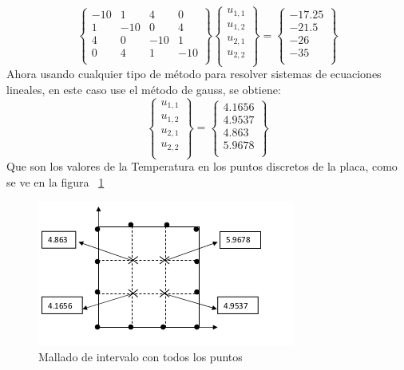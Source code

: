 \documentclass[11pt,a4paper]{article}
\begin{document}
$$
\left\{\begin{array}{cccc}
    -10 & 1 & 4 & 0 \\
    1 & -10 & 0 & 4 \\
    4 & 0 & -10 & 1 \\
    0 & 4 & 1 & -10 \\
    \end{array}\right\}
\left\{\begin{array}{c}
    u_{1,1}\\
    u_{1,2}\\
    u_{2,1}\\
    u_{2,2}\\
    \end{array}\right\}
    =
\left\{\begin{array}{c}
    -17.25\\
    -21.5\\
    -26\\
    -35\\
    \end{array}\right\}
$$
Ahora usando cualquier tipo de método para resolver sistemas de ecuaciones lineales, en este caso use el método de gauss, se obtiene:\\
$$
\left\{\begin{array}{c}
    u_{1,1}\\
    u_{1,2}\\
    u_{2,1}\\
    u_{2,2}\\
    \end{array}\right\}
=
\left\{\begin{array}{c}
    4.1656\\
    4.9537\\
    4.863\\
    5.9678\\
    \end{array}\right\}
$$
Que son los valores de la Temperatura en los puntos discretos de la placa, como se ve en la figura ~\ref{figura4}
\begin{figure}[htbp]
\begin{center}
\includegraphics[scale=0.75]{img_Sol_2}
\caption{Mallado de intervalo con todos los puntos}
\label{figura4}
\end{center}
\end{figure}
\end{document}

